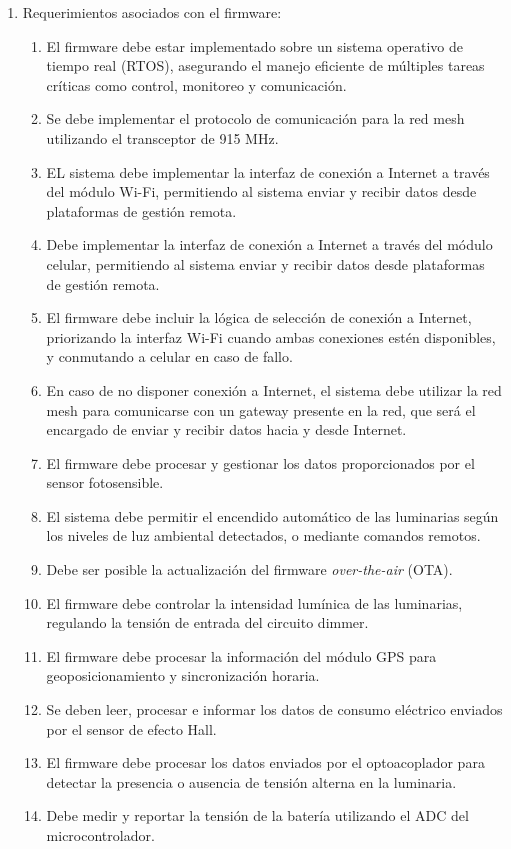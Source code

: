 \documentclass[
11pt, %
]{charter}
\begin{document}
\begin{enumerate}
	\item Requerimientos asociados con el firmware:
		\begin{enumerate}		
		\item El firmware debe estar implementado sobre un sistema operativo de tiempo real (RTOS), asegurando el manejo eficiente de múltiples tareas críticas como control, monitoreo y comunicación.
		\item Se debe implementar el protocolo de comunicación para la red mesh utilizando el transceptor de 915 MHz.
		\item EL sistema debe implementar la interfaz de conexión a Internet a través del módulo Wi-Fi, permitiendo al sistema enviar y recibir datos desde plataformas de	gestión remota.
		\item Debe implementar la interfaz de conexión a Internet a través del módulo celular, permitiendo al sistema enviar y recibir datos desde plataformas de gestión remota.
		\item El firmware debe incluir la lógica de selección de conexión a Internet, priorizando la interfaz Wi-Fi cuando ambas conexiones estén disponibles, y conmutando
			 a celular en caso de fallo.
		\item En caso de no disponer conexión a Internet, el sistema debe utilizar la red mesh para comunicarse con un gateway presente en la red, que será el encargado
			 de enviar y recibir datos hacia y desde Internet. 
		\item El firmware debe procesar y gestionar los datos proporcionados por el sensor fotosensible.
		\item El sistema debe permitir el encendido automático de las luminarias según los niveles de luz ambiental detectados, o mediante comandos remotos.
		\item Debe ser posible la actualización del firmware \textit{over-the-air} (OTA).
		\item El firmware debe controlar la intensidad lumínica de las luminarias, regulando la tensión de entrada del circuito dimmer.
		\item El firmware debe procesar la información del módulo GPS para geoposicionamiento y sincronización horaria.
		\item Se deben leer, procesar e informar los datos de consumo eléctrico enviados por el sensor de efecto Hall.
		\item El firmware debe procesar los datos enviados por el optoacoplador para detectar la presencia o ausencia de tensión alterna en la luminaria.
		\item Debe medir y reportar la tensión de la batería utilizando el ADC del microcontrolador.
		\end{enumerate}
\end{enumerate}
\end{document}
